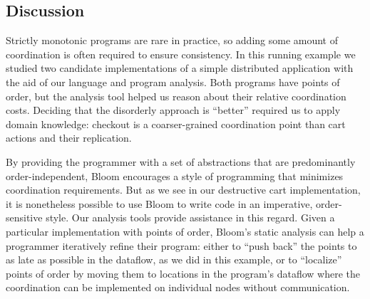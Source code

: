 \subsection{Discussion}
Strictly monotonic programs
are rare in practice, so adding some amount of coordination is often required to
ensure consistency. In this running example we studied
two candidate implementations of a simple distributed application with the aid of
our language and program analysis. Both programs have points of order, but the analysis tool helped us reason about their relative coordination costs.  Deciding that the disorderly
approach is ``better'' required us to apply domain knowledge: checkout is a coarser-grained coordination point than cart actions and their replication.

By providing the programmer with a set of abstractions that are predominantly
order-independent, Bloom encourages a style of programming that minimizes
coordination requirements. But as we see in our destructive cart implementation,
it is nonetheless possible to use Bloom to write code in an imperative,
order-sensitive style. Our analysis tools provide assistance in this regard.  Given a
particular implementation with points of order, Bloom's static analysis can help
a programmer iteratively refine their program: either to ``push back'' the
points to as late as possible in the dataflow, as we did in this example, or to
``localize'' points of order by moving them to locations in the program's dataflow
where the coordination can be implemented on individual nodes without
communication.
